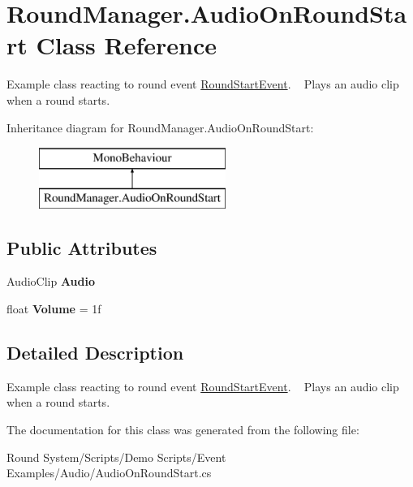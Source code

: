 \hypertarget{class_round_manager_1_1_audio_on_round_start}{}\section{Round\+Manager.\+Audio\+On\+Round\+Start Class Reference}
\label{class_round_manager_1_1_audio_on_round_start}


Example class reacting to round event \hyperlink{class_round_manager_1_1_events_1_1_round_start_event}{Round\+Start\+Event}. ~\newline
Plays an audio clip when a round starts.  


Inheritance diagram for Round\+Manager.\+Audio\+On\+Round\+Start\+:\begin{figure}[H]
\begin{center}
\leavevmode
\includegraphics[height=2.000000cm]{class_round_manager_1_1_audio_on_round_start}
\end{center}
\end{figure}
\subsection*{Public Attributes}
\begin{DoxyCompactItemize}
\item 
\hypertarget{class_round_manager_1_1_audio_on_round_start_a87b569b9a7b2218372ca9edddc9e0cfb}{}Audio\+Clip {\bfseries Audio}\label{class_round_manager_1_1_audio_on_round_start_a87b569b9a7b2218372ca9edddc9e0cfb}

\item 
\hypertarget{class_round_manager_1_1_audio_on_round_start_af3dfffa12a55e992fa1f35f128ba9354}{}float {\bfseries Volume} = 1f\label{class_round_manager_1_1_audio_on_round_start_af3dfffa12a55e992fa1f35f128ba9354}

\end{DoxyCompactItemize}


\subsection{Detailed Description}
Example class reacting to round event \hyperlink{class_round_manager_1_1_events_1_1_round_start_event}{Round\+Start\+Event}. ~\newline
Plays an audio clip when a round starts. 



The documentation for this class was generated from the following file\+:\begin{DoxyCompactItemize}
\item 
Round System/\+Scripts/\+Demo Scripts/\+Event Examples/\+Audio/Audio\+On\+Round\+Start.\+cs\end{DoxyCompactItemize}
